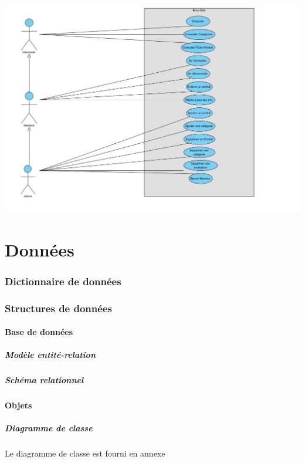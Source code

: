 \documentclass[10pt,a4paper]{article}
\begin{document}
				\includegraphics[scale=0.5]{cas/diagramme.jpg}
	\newpage			
	\part{Données}
		\section{Dictionnaire de données}
			
		\section{Structures de données}
			\subsection{Base de données}
				\subsubsection{Modèle entité-relation}
				\subsubsection{Schéma relationnel}
			\subsection{Objets}
				\subsubsection{Diagramme de classe}
					Le diagramme de classe est fourni en annexe
					\newline
					
\end{document}
